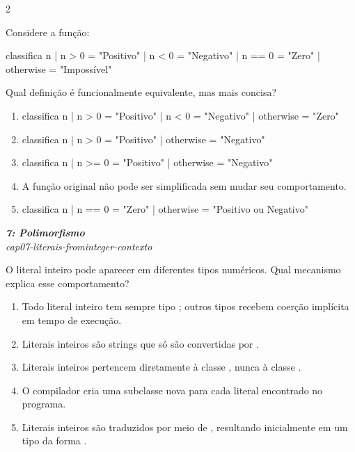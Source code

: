 \documentclass[a4paper,10pt,brazil]{article}
\begin{document}
\begin{multicols}{2}
\begin{flushright}
\end{flushright}
Considere a função:
\begin{haskellcode}
classifica n
  | n > 0     = "Positivo"
  | n < 0     = "Negativo"
  | n == 0    = "Zero"
  | otherwise = "Impossível"
\end{haskellcode}
Qual definição é funcionalmente equivalente, mas mais concisa?

\begin{enumerate}
  \item \begin{haskellcode}
classifica n
  | n > 0     = "Positivo"
  | n < 0     = "Negativo"
  | otherwise = "Zero"
\end{haskellcode}

  \item \begin{haskellcode}
classifica n
  | n > 0     = "Positivo"
  | otherwise = "Negativo"
\end{haskellcode}

  \item \begin{haskellcode}
classifica n
  | n >= 0    = "Positivo"
  | otherwise = "Negativo"
\end{haskellcode}

  \item A função original não pode ser simplificada sem mudar seu comportamento.

  \item \begin{haskellcode}
classifica n
  | n == 0    = "Zero"
  | otherwise = "Positivo ou Negativo"
\end{haskellcode}


\end{enumerate}

\begin{flushright}
  \footnotesize
  \textit{\textbf{7: Polimorfismo}}\\
  \textit{cap07-literais-frominteger-contexto}\\

\end{flushright}
O literal inteiro  pode aparecer em diferentes tipos numéricos. Qual mecanismo explica esse comportamento?
\begin{enumerate}
  \item Todo literal inteiro tem sempre tipo ; outros tipos recebem coerção implícita em tempo de execução.
  \item Literais inteiros são strings que só são convertidas por .
  \item Literais inteiros pertencem diretamente à classe , nunca à classe .
  \item O compilador cria uma subclasse nova para cada literal encontrado no programa.
  \item Literais inteiros são traduzidos por meio de , resultando inicialmente em um tipo da forma .


\end{enumerate}
\end{multicols}
\end{document}
